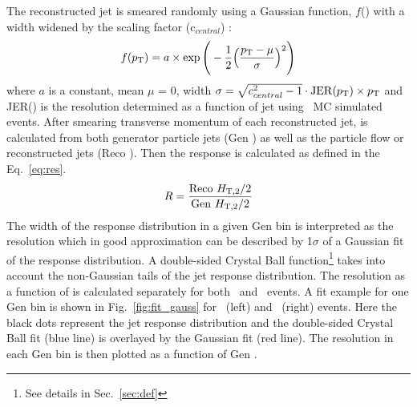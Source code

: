
The reconstructed jet \pt is smeared randomly using a Gaussian function, $f$(\pt) with a width widened by the scaling factor (c$_{central}$) :
\begin{equation}
f(\pt) = a \times \exp\Bigg(-\frac{1}{2}\Big(\frac{\pt - \mu}{\sigma}\Big)^2\Bigg)
\end{equation}
where $a$ is a constant, mean $\mu$ = 0, width $\sigma = \sqrt{c^2_{central} - 1} \cdot {\rm JER}(p_{\mathrm{T}}) \times p_{\mathrm{T}}$ and JER(\pt) is the resolution determined as a function of jet \pt using \MGP~MC simulated events. After smearing transverse momentum of each reconstructed jet, \httwo is calculated from both generator particle jets (Gen \httwons) as well as the particle flow or reconstructed jets (Reco \httwons). Then the response is calculated as defined in the Eq.~\ref{eq:res}. 
\begin{equation}
\label{eq:res}
 R = \frac{{\rm Reco}~\httwo}{{\rm Gen}~\httwo}
\end{equation}
The width of the response distribution in a given Gen \httwo bin is interpreted as the resolution which in good approximation can be described by 1$\sigma$ of a Gaussian fit of the response distribution. A double-sided Crystal Ball function\footnote{See details in Sec.~\ref{sec:def}} takes into account the non-Gaussian tails of the jet response distribution. The resolution as a function of \httwo is calculated separately for both \njt~and \njth~events. A fit example for one Gen \httwo bin is shown in Fig.~\ref{fig:fit_gauss} for \njt~(left) and \njth~(right) events. Here the black dots represent the jet response distribution and the double-sided Crystal Ball fit (blue line) is overlayed by the Gaussian fit (red line). The resolution in each Gen \httwo bin is then plotted as a function of Gen \httwo. 

